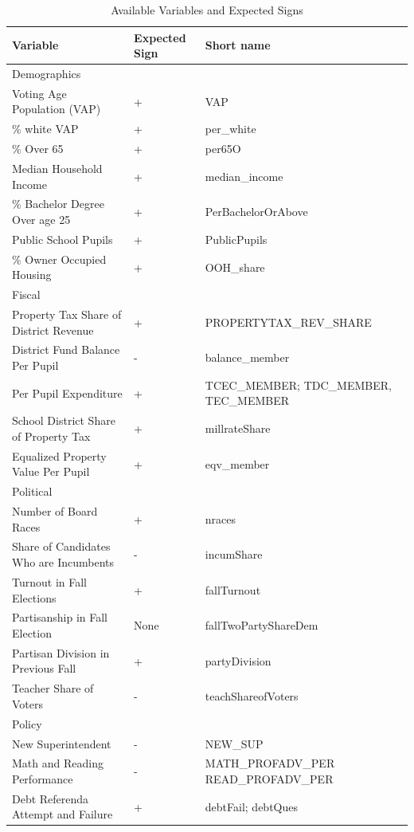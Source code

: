 \begin{table}[h!]
\begin{center}
\begin{tiny}
\caption{Available Variables and Expected Signs}
\label{tab:candIV}
\begin{tabular}{| p{} | p{} | p{} |} 
\hline
\textbf{Variable}  & \textbf{Expected Sign} & \textbf{Short name} \\ \hline
Demographics  &  & \\ \hline 
Voting Age Population (VAP) & + & VAP \\
\% white VAP & + & per\_white \\
\% Over 65 & + & per65O \\
Median Household Income & + & median\_income \\
\% Bachelor Degree Over age 25 & + & PerBachelorOrAbove \\
Public School Pupils & + & PublicPupils \\
\% Owner Occupied Housing & + & OOH\_share \\ \hline
Fiscal & & \\ \hline
Property Tax Share of District Revenue & + & PROPERTYTAX\_REV\_SHARE \\
District Fund Balance Per Pupil & - & balance\_member \\
Per Pupil Expenditure & + & TCEC\_MEMBER; TDC\_MEMBER, TEC\_MEMBER \\
School District Share of Property Tax & + & millrateShare \\ 
Equalized Property Value Per Pupil & + & eqv\_member \\ \hline
Political & & \\ \hline
Number of Board Races & + & nraces \\
Share of Candidates Who are Incumbents & - & incumShare \\
Turnout in Fall Elections & + & fallTurnout \\
Partisanship in Fall Election & None & fallTwoPartyShareDem \\
Partisan Division in Previous Fall & + & partyDivision \\
Teacher Share of Voters & - & teachShareofVoters \\ \hline
Policy & & \\ \hline
New Superintendent & - & NEW\_SUP \\
Math and Reading Performance & - & MATH\_PROFADV\_PER READ\_PROFADV\_PER \\
Debt Referenda Attempt and Failure & + & debtFail; debtQues \\

\end{tabular}
\end{tiny}
\end{center}
\end{table}
